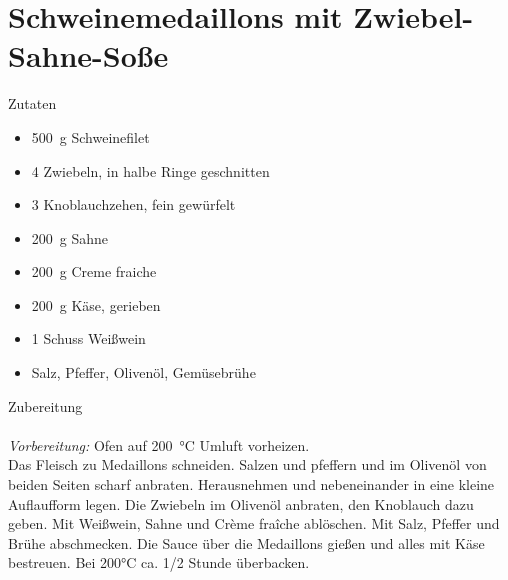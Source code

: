 \section*{Schweinemedaillons mit Zwiebel-Sahne-Soße}
\ihead{}\ohead{}
\cfoot{}
{\Large Zutaten}
\begin{multicols}{2}
\begin{itemize}
    \item \SI{500}{g} Schweinefilet
    \item \num{4} Zwiebeln, in halbe Ringe geschnitten 
    \item \num{3} Knoblauchzehen, fein gewürfelt
    \item \SI{200}{g} Sahne
    \item \SI{200}{g} Creme fraiche
    \item \SI{200}{g} Käse, gerieben
    \item \num{1} Schuss Weißwein
    \item Salz, Pfeffer, Olivenöl, Gemüsebrühe
\end{itemize}
\end{multicols}
\noindent
{\Large Zubereitung}\\
\\
\textit{Vorbereitung:} Ofen auf \SI{200}{\celsius} Umluft vorheizen.\\
Das Fleisch zu Medaillons schneiden.
Salzen und pfeffern und im Olivenöl von beiden Seiten scharf anbraten. 
Herausnehmen und nebeneinander in eine kleine Auflaufform legen.
Die Zwiebeln im Olivenöl anbraten, den Knoblauch dazu geben.
Mit Weißwein, Sahne und Crème fraîche ablöschen.
Mit Salz, Pfeffer und Brühe abschmecken.
Die Sauce über die Medaillons gießen und alles mit Käse bestreuen.
Bei 200°C ca. 1/2 Stunde überbacken.
